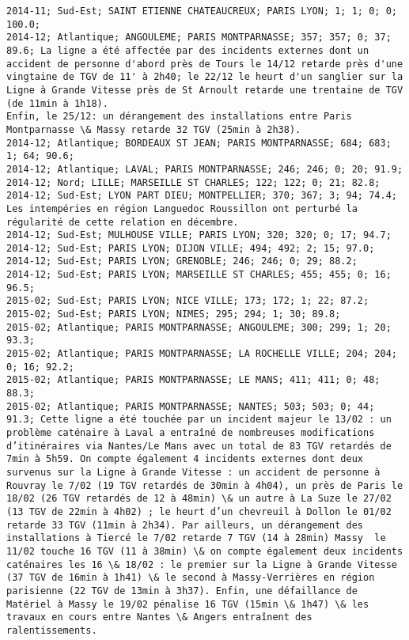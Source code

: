 \documentclass{article}
\begin{document}
\begin{Verbatim}[commandchars=\\\{\}]
2014-11; Sud-Est; SAINT ETIENNE CHATEAUCREUX; PARIS LYON; 1; 1; 0; 0; 100.0; 
2014-12; Atlantique; ANGOULEME; PARIS MONTPARNASSE; 357; 357; 0; 37; 89.6; La ligne a été affectée par des incidents externes dont un accident de personne d'abord près de Tours le 14/12 retarde près d'une vingtaine de TGV de 11' à 2h40; le 22/12 le heurt d'un sanglier sur la Ligne à Grande Vitesse près de St Arnoult retarde une trentaine de TGV (de 11min à 1h18).
Enfin, le 25/12: un dérangement des installations entre Paris Montparnasse \& Massy retarde 32 TGV (25min à 2h38).
2014-12; Atlantique; BORDEAUX ST JEAN; PARIS MONTPARNASSE; 684; 683; 1; 64; 90.6; 
2014-12; Atlantique; LAVAL; PARIS MONTPARNASSE; 246; 246; 0; 20; 91.9; 
2014-12; Nord; LILLE; MARSEILLE ST CHARLES; 122; 122; 0; 21; 82.8; 
2014-12; Sud-Est; LYON PART DIEU; MONTPELLIER; 370; 367; 3; 94; 74.4; Les intempéries en région Languedoc Roussillon ont perturbé la régularité de cette relation en décembre.
2014-12; Sud-Est; MULHOUSE VILLE; PARIS LYON; 320; 320; 0; 17; 94.7; 
2014-12; Sud-Est; PARIS LYON; DIJON VILLE; 494; 492; 2; 15; 97.0; 
2014-12; Sud-Est; PARIS LYON; GRENOBLE; 246; 246; 0; 29; 88.2; 
2014-12; Sud-Est; PARIS LYON; MARSEILLE ST CHARLES; 455; 455; 0; 16; 96.5; 
2015-02; Sud-Est; PARIS LYON; NICE VILLE; 173; 172; 1; 22; 87.2; 
2015-02; Sud-Est; PARIS LYON; NIMES; 295; 294; 1; 30; 89.8; 
2015-02; Atlantique; PARIS MONTPARNASSE; ANGOULEME; 300; 299; 1; 20; 93.3; 
2015-02; Atlantique; PARIS MONTPARNASSE; LA ROCHELLE VILLE; 204; 204; 0; 16; 92.2; 
2015-02; Atlantique; PARIS MONTPARNASSE; LE MANS; 411; 411; 0; 48; 88.3; 
2015-02; Atlantique; PARIS MONTPARNASSE; NANTES; 503; 503; 0; 44; 91.3; Cette ligne a été touchée par un incident majeur le 13/02 : un problème caténaire à Laval a entraîné de nombreuses modifications d’itinéraires via Nantes/Le Mans avec un total de 83 TGV retardés de 7min à 5h59. On compte également 4 incidents externes dont deux survenus sur la Ligne à Grande Vitesse : un accident de personne à Rouvray le 7/02 (19 TGV retardés de 30min à 4h04), un près de Paris le 18/02 (26 TGV retardés de 12 à 48min) \& un autre à La Suze le 27/02 (13 TGV de 22min à 4h02) ; le heurt d’un chevreuil à Dollon le 01/02 retarde 33 TGV (11min à 2h34). Par ailleurs, un dérangement des installations à Tiercé le 7/02 retarde 7 TGV (14 à 28min) Massy  le 11/02 touche 16 TGV (11 à 38min) \& on compte également deux incidents caténaires les 16 \& 18/02 : le premier sur la Ligne à Grande Vitesse (37 TGV de 16min à 1h41) \& le second à Massy-Verrières en région parisienne (22 TGV de 13min à 3h37). Enfin, une défaillance de Matériel à Massy le 19/02 pénalise 16 TGV (15min \& 1h47) \& les travaux en cours entre Nantes \& Angers entraînent des ralentissements.

\end{Verbatim}
\end{document}
